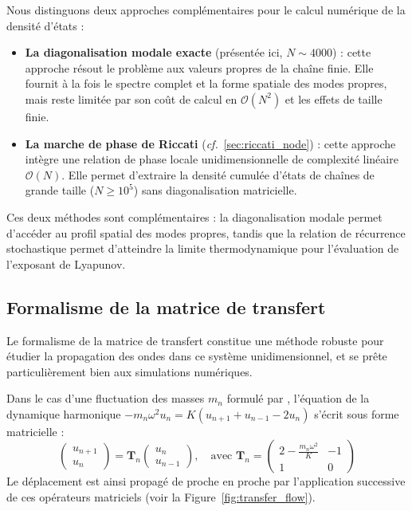 Nous distinguons deux approches complémentaires pour le calcul numérique de la densité d'états :
\begin{itemize}
    \item \textbf{La diagonalisation modale exacte} (présentée ici, $N \sim 4000$) : cette approche résout le problème aux valeurs propres de la chaîne finie. Elle fournit à la fois le spectre complet et la forme spatiale des modes propres, mais reste limitée par son coût de calcul en $\mathcal{O}(N^2)$ et les effets de taille finie.
    \item \textbf{La marche de phase de Riccati} (\textit{cf.}~\ref{sec:riccati_node}) : cette approche intègre une relation de phase locale unidimensionnelle de complexité linéaire $\mathcal{O}(N)$. Elle permet d'extraire la densité cumulée d'états de chaînes de grande taille ($N \ge 10^5$) sans diagonalisation matricielle.
\end{itemize}
Ces deux méthodes sont complémentaires : la diagonalisation modale permet d'accéder au profil spatial des modes propres, tandis que la relation de récurrence stochastique permet d'atteindre la limite thermodynamique pour l'évaluation de l'exposant de Lyapunov.

\subsection{Formalisme de la matrice de transfert}

Le formalisme de la matrice de transfert constitue une méthode robuste pour étudier la propagation des ondes dans ce système unidimensionnel, et se prête particulièrement bien aux simulations numériques. 

Dans le cas d'une fluctuation des masses $m_n$ formulé par \textcite{matsuda1970localization}, l'équation de la dynamique harmonique $-m_n \omega^2 u_n = K(u_{n+1} + u_{n-1} - 2u_n)$ s'écrit sous forme matricielle :
\[ \begin{pmatrix} u_{n+1} \\ u_n \end{pmatrix} = \mathbf{T}_n \begin{pmatrix} u_n \\ u_{n-1} \end{pmatrix}, \quad \text{avec } \mathbf{T}_n = \begin{pmatrix} 2 - \frac{m_n \omega^2}{K} & -1 \\ 1 & 0 \end{pmatrix} \]
Le déplacement est ainsi propagé de proche en proche par l'application successive de ces opérateurs matriciels (voir la Figure~\ref{fig:transfer_flow}).


